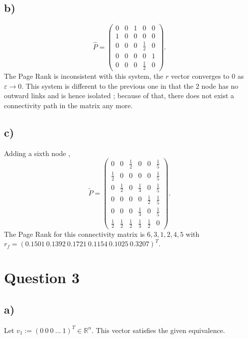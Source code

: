 \documentclass[12pt]{article}
\theoremstyle{definition}
\theoremstyle{definition}
\theoremstyle{definition}
\theoremstyle{definition}
\theoremstyle{definition}
\theoremstyle{example}
\theoremstyle{note}
\theoremstyle{remark}
\theoremstyle{example}
\begin{document}
			\subsection*{b) }
				\begin{equation}
					\hat{P} = \begin{pmatrix}
					0 & 0 & 1 & 0 & 0 \\
					1 & 0 & 0 & 0 & 0 \\
					0 & 0 & 0 & \frac12 & 0 \\
					0 & 0 & 0 & 0 & 1 \\
					0 & 0 & 0 & \frac12 & 0 
					\end{pmatrix}.
				\end{equation}
				The Page Rank is inconsistent with this system, the $r$ vector converges to $0$ as $\varepsilon \to 0$. This system is different to the previous one in that the $2$ node has no outward links and is hence isolated ; because of that, there does not exist a connectivity path in the matrix any more. 
			
			\subsection*{c) }
				Adding a sixth node ,
				\begin{equation}
					\widetilde{P} = \begin{pmatrix}
					0 & 0 & \frac12 & 0 & 0 & \frac15 \\
					\frac12 & 0 & 0 & 0 & 0 & \frac15\\
					0 & \frac12 & 0 & \frac13 & 0 & \frac15\\
					0 & 0 & 0 & 0 & \frac12& \frac15 \\
					0 & 0 & 0 & \frac13 & 0 & \frac15\\
					\frac12 & \frac12 & \frac12 & \frac13 & \frac12 & 0
					\end{pmatrix}. 
				\end{equation}
				The Page Rank for this connectivity matrix is $6,3,1,2,4,5$ with \\ $r_{f} = (0.1501 \ 0.1392 \ 0.1721 \ 0.1154 \ 0.1025 \ 0.3207)^{T}.$
		\section*{Question 3} 
			\subsection*{a) }
				Let $v_{1} := (0 \ 0 \ 0 \ \dots \ 1)^{T} \in \mathbb{R}^{n}$. This vector satisfies the given equivalence. 
\end{document}
